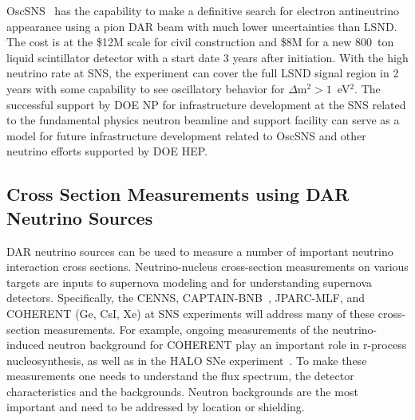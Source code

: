 
\noindent OscSNS~\cite{OscSNS} has the capability to make a definitive
search for electron antineutrino appearance using a pion DAR beam with
much lower uncertainties than LSND. The cost is at the \$12M scale for
civil construction and \$8M for a new 800~ton liquid scintillator
detector with a start date 3 years after initiation. With the high
neutrino rate at SNS, the experiment can cover the full LSND signal
region in 2 years with some capability to see oscillatory behavior for
$\Delta$m$^2 > 1$~eV$^2$. The successful support by DOE NP for
infrastructure development at the SNS related to the fundamental
physics neutron beamline and support facility can serve as a model for
future infrastructure development related to OscSNS and other neutrino
efforts supported by DOE HEP.

\subsection{Cross Section Measurements using DAR Neutrino Sources}

\noindent DAR neutrino sources can be used to measure a number of
important neutrino interaction cross sections. Neutrino-nucleus
cross-section measurements on various targets are inputs to supernova
modeling and for understanding supernova detectors. Specifically, the
CENNS, CAPTAIN-BNB~\cite{Berns:2013usa}, JPARC-MLF, and COHERENT (Ge,
CsI, Xe) at SNS experiments will address many of these cross-section
measurements. For example, ongoing measurements of the
neutrino-induced neutron background for COHERENT play an important
role in r-process nucleosynthesis, as well as in the HALO SNe
experiment~\cite{halo}. To make these measurements one needs to
understand the flux spectrum, the detector characteristics and the
backgrounds. Neutron backgrounds are the most important and need to be
addressed by location or shielding.
